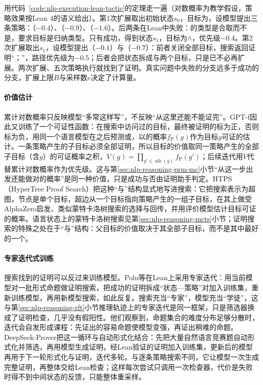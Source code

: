 用代码~\ref{code:nlp-execution-lean-tactic}的定理走一遍（对数概率为教学假设，策略效果按Lean 4的语义给出）。第1次扩展取出初始状态$s_0$，目标为，设模型提出三条策略：（$-0.4$）、（$-0.9$）、（$-1.6$）。后两条在Lean中失败：的类型是合取而不是，要求目标是归纳类型。只有成功，得到状态$s_1$，目标为$\land$，优先级$-0.4$。第2次扩展取出$s_1$，设模型提出（$-0.1$）与（$-0.7$）：前者关闭全部目标，搜索返回证明“；”，路径优先级为$-0.5$；后者会把状态拆成与两个目标，只是已不必再扩展。两次扩展、五次策略执行就找到了证明。真实问题中失败的分支远多于成功的分支，扩展上限$B$与采样数$e$决定了计算量。

\paragraph{价值估计}
累计对数概率只反映模型“多常这样写”，不反映“从这里还能不能证完”。GPT-f因此又训练了一个可证性函数：在搜索中访问过的目标，最终被证明的标为正，否则标为负，用同一个语言模型在之后预测或，以的概率$f_{\mathrm{P}}(g)$作为目标$g$可证的估计。一条策略产生的子目标必须全部证明，所以目标的价值取同一策略产生的全部子目标（含$g$）的可证概率之积，$V(g)=\prod_{g'\in\operatorname{sib}(g)}f_{\mathrm{P}}(g')$；后续迭代用$V$代替累计对数概率作为优先级。这与第\ref{sec:nlp-reasoning-prm-mc}小节“从这一步出发还能做对的概率”是同一种价值，只是成功与否由证明助手判定。HTPS（HyperTree Proof Search）把这种“与”结构显式地写进搜索：它把搜索表示为超图，节点是单个目标，超边从一个目标指向策略产生的一组子目标，在其上做受AlphaZero启发、类似蒙特卡洛树搜索的选择与回传，并用评价模型估计目标可证的概率。语言状态上的蒙特卡洛树搜索见第\ref{sec:nlp-reasoning-mcts}小节；证明搜索的特殊之处在于“与”结构：父目标的价值取决于其全部子目标，而不是其中最好的一个。

\paragraph{专家迭代式训练}
搜索找到的证明可以反过来训练模型。Polu等在Lean上采用专家迭代：用当前模型对一批形式命题做证明搜索，把成功的证明拆成“状态—策略”对加入训练集，重新训练模型，再用新模型搜索，如此反复。搜索充当“专家”，模型充当“学徒”，这与第\ref{sec:nlp-reasoning-rft}小节推理轨迹上的专家迭代是同一框架，只是筛选器换成了证明检查，几乎没有假阳性。他们观察到，命题集合的难度分布足够分散时，迭代会自发形成课程：先证出的容易命题使模型变强，再证出稍难的命题。DeepSeek-Prover把这一循环与自动形式化结合：先把大量自然语言竞赛题自动形式化并筛选，再用模型生成证明，经Lean验证的证明加入训练集，更新后的模型再用于下一轮形式化与证明，迭代多轮。与逐条策略搜索不同，它让模型一次生成完整证明，再整体交给Lean检查；这样每次尝试只调用一次检查器，代价是失败时得不到中间状态的反馈，只能整体重采样。

